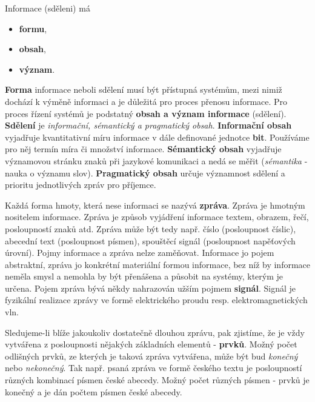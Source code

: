 {    Informace (sděleni) má
    \begin{itemize}\addtolength{\itemsep}{-0.4\baselineskip}
      \item \textbf{formu},
      \item \textbf{obsah},
      \item \textbf{význam}.
    \end{itemize}
    \textbf{Forma} informace neboli sdělení musí být přístupná systémům, mezi nimiž dochází k 
    výměně informaci a je důležitá pro proces přenosu informace. Pro proces řízení systémů je 
    podstatný \textbf{obsah a význam informace} (sdělení). \textbf{Sdělení} je \emph{informační, 
    sémantický a pragmatický obsah}. \textbf{Informační obsah} vyjadřuje kvantitativní míru 
    informace v dále definované jednotce \textbf{bit}. Používáme pro něj termín míra či množství 
    informace. \textbf{Sémantický obsah} vyjadřuje významovou stránku znaků při jazykové komunikaci 
    a nedá se měřit (\emph{sémantika} - nauka o významu slov). \textbf{Pragmatický obsah} určuje 
    významnost sdělení a prioritu jednotlivých zpráv pro příjemce.
    
    Každá forma hmoty, která nese informaci se nazývá \textbf{zpráva}. Zpráva je hmotným nositelem 
    informace. Zpráva je způsob vyjádření informace textem, obrazem, řečí, posloupností znaků atd. 
    Zpráva může být tedy např. číslo (posloupnost číslic), abecední text (posloupnost písmen), 
    spouštěcí signál (posloupnost napěťových úrovní). Pojmy informace a zpráva nelze zaměňovat. 
    Informace jo pojem abstraktní, zpráva jo konkrétní materiální formou informace, bez níž by 
    informace neměla smysl a nemohla by být přenášena a působit na systémy, kterým je určena. Pojem 
    zpráva bývá někdy nahrazován užším pojmem \textbf{signál}. Signál je fyzikální realizace zprávy 
    ve formě elektrického proudu resp. elektromagnetických vln.
      
    Sledujeme-li blíže jakoukoliv dostatečně dlouhou zprávu, pak zjistíme, že je vždy vytvářena z 
    posloupnosti nějakých základních elementů - \textbf{prvků}. Možný počet odlišných prvků, ze 
    kterých je taková zpráva vytvářena, může být bud \emph{konečný} nebo \emph{nekonečný}. Tak 
    např. psaná zpráva ve formě českého textu je posloupností různých kombinací písmen české 
    abecedy. Možný počet různých písmen - prvků je konečný a je dán počtem písmen české abecedy.
      
}
